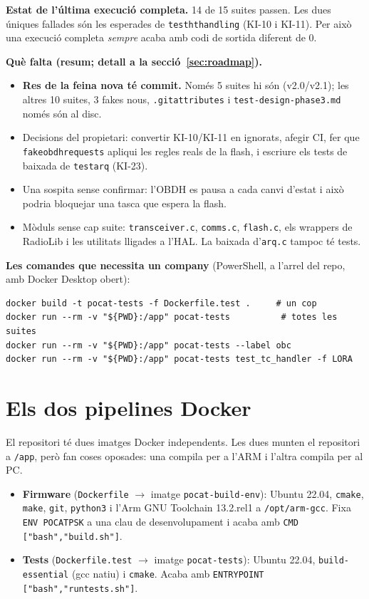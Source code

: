 \documentclass[11pt,a4paper]{article}
\DeclareRobustCommand{\_}{\textunderscore\allowbreak}
\newcommand{\cd}[1]{\texttt{#1}}
\begin{document}
\textbf{Estat de l'última execució completa.} 14 de 15 suites passen. Les dues
úniques fallades són les esperades de \cd{test\_ht\_handling} (KI-10 i KI-11).
Per això una execució completa \emph{sempre} acaba amb codi de sortida diferent de 0.

\textbf{Què falta (resum; detall a la secció~\ref{sec:roadmap}).}
\begin{itemize}
\item \textbf{Res de la feina nova té commit.} Només 5 suites hi són (v2.0/v2.1);
      les altres 10 suites, 3 fakes nous, \cd{.gitattributes} i \cd{test-design-phase3.md} només són al disc.
\item Decisions del propietari: convertir KI-10/KI-11 en ignorats, afegir CI, fer que
      \cd{fake\_obdh\_requests} apliqui les regles reals de la flash, i escriure els tests
      de baixada de \cd{test\_arq} (KI-23).
\item Una sospita sense confirmar: l'OBDH es pausa a cada canvi d'estat i això podria
      bloquejar una tasca que espera la flash.
\item Mòduls sense cap suite: \cd{transceiver.c}, \cd{comms.c}, \cd{flash.c}, els wrappers de RadioLib i
      les utilitats lligades a l'HAL. La baixada d'\cd{arq.c} tampoc té tests.
\end{itemize}

\textbf{Les comandes que necessita un company} (PowerShell, a l'arrel del repo, amb Docker Desktop obert):
\begin{lstlisting}
docker build -t pocat-tests -f Dockerfile.test .     # un cop
docker run --rm -v "${PWD}:/app" pocat-tests          # totes les suites
docker run --rm -v "${PWD}:/app" pocat-tests --label obc
docker run --rm -v "${PWD}:/app" pocat-tests test_tc_handler -f LORA
\end{lstlisting}

\clearpage
\section{Els dos pipelines Docker}\label{sec:docker}

El repositori té dues imatges Docker independents. Les dues munten el
repositori a \cd{/app}, però fan coses oposades: una compila per a l'ARM i
l'altra compila per al PC.

\begin{itemize}
\item \textbf{Firmware} (\cd{Dockerfile} \ensuremath{\rightarrow} imatge \cd{pocat-build-env}): Ubuntu 22.04,
  \cd{cmake}, \cd{make}, \cd{git}, \cd{python3} i l'Arm GNU Toolchain 13.2.rel1 a \cd{/opt/arm-gcc}.
  Fixa \cd{ENV POCAT\_PSK} a una clau de desenvolupament i acaba amb \cd{CMD ["bash","build.sh"]}.
\item \textbf{Tests} (\cd{Dockerfile.test} \ensuremath{\rightarrow} imatge \cd{pocat-tests}): Ubuntu 22.04,
  \cd{build-essential} (gcc natiu) i \cd{cmake}. Acaba amb
  \cd{ENTRYPOINT ["bash","run\_tests.sh"]}.
\end{itemize}
\end{document}
